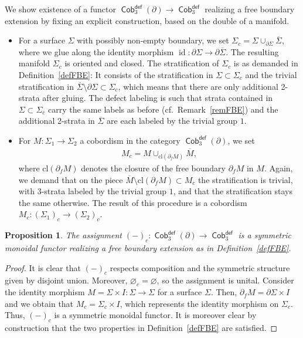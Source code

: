 \documentclass[pdftex]{sigma}
\DeclareMathOperator{\id}{id}
\DeclareMathOperator{\Cob}{\mathsf{Cob}}
\numberwithin{equation}{section}
\newtheorem{Proposition}[Proposition]{Proposition}
\theoremstyle{definition}
\begin{document}
We show existence of a functor $\Cob_3^{\mathsf{def}}(\partial) \rightarrow \Cob_3^{\mathsf{def}}$ realizing a free boundary extension by fixing an explicit construction, based on the double of a manifold.
\begin{itemize}\itemsep=0pt
 \item For a surface $\Sigma$ with possibly non-empty boundary, we set $\Sigma_c = \Sigma \cup_{\partial \Sigma} \overline{\Sigma}$, where we glue along the identity morphism $\id\colon \partial \Sigma \rightarrow \partial \overline{\Sigma}$. The resulting manifold $\Sigma_c$ is oriented and closed. The stratification of $\Sigma_c$ is as demanded in Definition~\ref{defFBE}: It consists of the stratification in $\Sigma \subset \Sigma_c$ and the trivial stratification in $\overline{\Sigma}\setminus \partial \Sigma \subset \Sigma_c$, which means that there are only additional 2-strata after gluing. The defect labeling is such that strata contained in $\Sigma \subset \Sigma_c$ carry the same labels as before (cf.\ Remark~\ref{remFBE}) and the additional 2-strata in $\overline{\Sigma}$ are each labeled by the trivial group $1$.
 \item For $M\colon \Sigma_1 \rightarrow \Sigma_2$ a cobordism in the category $\Cob_3^{\mathsf{def}}(\partial)$, we set
 \begin{align*}
 M_c = M \cup_{\mathrm{cl}(\partial_fM)} \overline{M},
 \end{align*}
 where $\mathrm{cl}(\partial_fM)$ denotes the closure of the free boundary $\partial_fM$ in $M$. Again, we demand that on the piece $\overline{M} \setminus \mathrm{cl}(\partial_f M) \subset M_c$ the stratification is trivial, with 3-strata labeled by the trivial group $1$, and that the stratification stays the same otherwise. The result of this procedure is a cobordism $M_c\colon \left(\Sigma_1\right)_c \rightarrow \left(\Sigma_2\right)_c$.
\end{itemize}

\begin{Proposition} \label{propCobF}
 The assignment $(-)_c\colon \Cob_3^{\mathsf{def}}(\partial) \rightarrow \Cob_3^{\mathsf{def}}$ is a symmetric monoidal functor realizing a free boundary extension as in Definition~{\rm \ref{defFBE}}.
\end{Proposition}
\begin{proof}
It is clear that $(-)_c$ respects composition and the symmetric structure given by disjoint union. Moreover, $\varnothing_c = \varnothing$, so the assignment is unital. Consider the identity morphism $M = \Sigma \times I\colon \Sigma \rightarrow \Sigma$ for a surface $\Sigma$. Then, $\partial_fM = \partial \Sigma \times I$ and we obtain that $M_c = \Sigma_c \times I$, which represents the identity morphism on $\Sigma_c$. Thus, $(-)_c$ is a symmetric monoidal functor. It is moreover clear by construction that the two properties in Definition~\ref{defFBE} are satisfied.
\end{proof}
\end{document}
